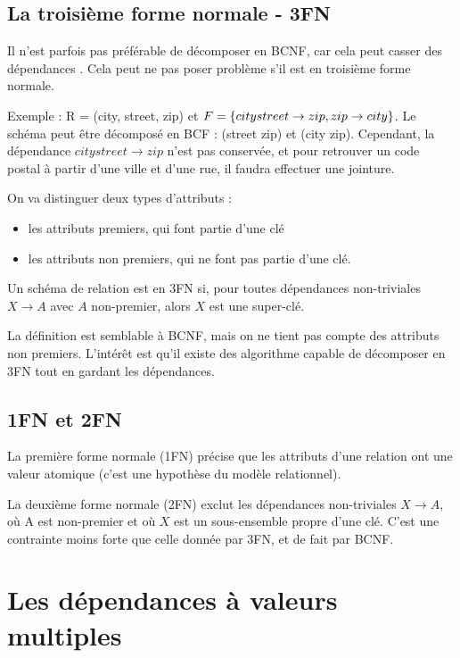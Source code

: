 		
		\subsection{La troisième forme normale - 3FN}
		
		Il n'est parfois pas préférable de décomposer en BCNF, car cela peut casser des dépendances . Cela peut ne pas poser problème s'il est en troisième forme normale.
		
		Exemple : R = (city, street, zip) et $F = \lbrace city street \rightarrow zip , zip \rightarrow city \rbrace$. Le schéma peut être décomposé en BCF : (street zip) et (city zip). Cependant, la dépendance $city street \rightarrow zip$ n'est pas conservée, et pour retrouver un code postal à partir d'une ville et d'une rue, il faudra effectuer une jointure.
		
		On va distinguer deux types d'attributs :
		
		\begin{itemize}
			\item les attributs premiers, qui font partie d'une clé
			\item les attributs non premiers, qui ne font pas partie d'une clé.
		\end{itemize}
		
		Un schéma de relation est en 3FN si, pour toutes dépendances non-triviales $X \rightarrow A$ avec $A$ non-premier, alors $X$ est une super-clé.
		
		La définition est semblable à BCNF, mais on ne tient pas compte des attributs non premiers. L'intérêt est qu'il existe des algorithme capable de décomposer en 3FN tout en gardant les dépendances.
		
		\subsection{1FN et 2FN}
		
		La première forme normale (1FN) précise que les attributs d'une relation ont une valeur atomique (c'est une hypothèse du modèle relationnel).
		
		La deuxième forme normale (2FN) exclut les dépendances non-triviales $X \rightarrow A$, où A est non-premier et où $X$ est un sous-ensemble propre d'une clé. C'est une contrainte moins forte que celle donnée par 3FN, et de fait par BCNF.
		
	\section{Les dépendances à valeurs multiples}
	

